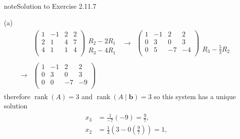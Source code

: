 \documentclass[letterpaper,10pt,english]{jupyterBook}
\begin{document}
\begin{sphinxadmonition}{note}{Solution to Exercise 2.11.7}



\sphinxAtStartPar
(a)
\begin{equation*}
\begin{split} \begin{align*}
&    \left( \begin{array}{ccc|c}
         1 & -1 & 2 & 2 \\
         2 & 1 & 4 & 7 \\
         4 & 1 & 1 & 4 \\
    \end{array} \right)
    \begin{matrix} \phantom{x} \\ R_{2} - 2 R_{1} \\ R_{3} - 4 R_{1} \end{matrix} &
    \longrightarrow &
    \left( \begin{array}{ccc|c}
         1 & -1 & 2 & 2 \\
         0 & 3 & 0 & 3 \\
         0 & 5 & -7 & -4 \\
    \end{array} \right)
    \begin{matrix} \phantom{x} \\ \phantom{x} \\ R_{3} - \frac{5}{3} R_{2} \end{matrix} \\ \\
    \longrightarrow &
    \left( \begin{array}{ccc|c}
         1 & -1 & 2 & 2 \\
         0 & 3 & 0 & 3 \\
         0 & 0 & -7 & -9 \\
    \end{array} \right)
\end{align*} \end{split}
\end{equation*}
\sphinxAtStartPar
therefore \(\operatorname{rank}(A) = 3\) and \(\operatorname{rank}(A \mid \mathbf{b}) = 3\) so this system has a unique solution
\begin{equation*}
\begin{split} \begin{align*}
    x_{3} &= \frac{1}{-7} \left( -9\right) = \frac{9}{7}, \\
    x_{2} &= \frac{1}{3} \left( 3 - 0 \left( \frac{9}{7} \right)\right) = 1, \\

\end{align*}
\end{split}
\end{equation*}
\end{sphinxadmonition}
\end{document}
